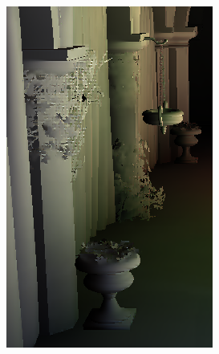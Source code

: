 \begin{figure}[htb]
\begin{subfigure}[b]{0.20\textwidth}
        \includegraphics[width=.95\textwidth]{screenshots/interleaved_final}%
        \caption{}
        \label{fig:results:interleaved_final}%
    \end{subfigure}%
    \begin{subfigure}[b]{0.20\textwidth}
        \centering

\end{subfigure}
\end{figure}
